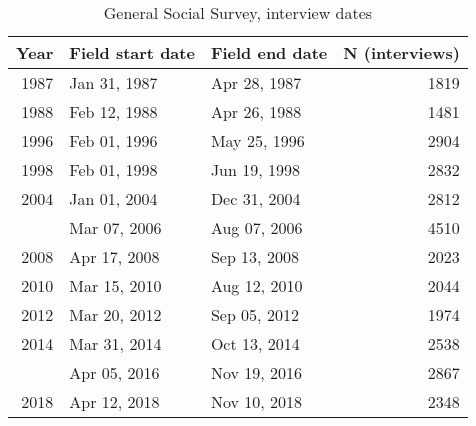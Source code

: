 \begin{table}[!h]

\caption{\label{tab:gss_date}General Social Survey, interview dates}
\centering
\begin{tabular}[t]{rllr}
\toprule
Year & Field start date & Field end date & N (interviews)\\
\midrule
1987 & Jan 31, 1987 & Apr 28, 1987 & 1819\\
1988 & Feb 12, 1988 & Apr 26, 1988 & 1481\\
1996 & Feb 01, 1996 & May 25, 1996 & 2904\\
1998 & Feb 01, 1998 & Jun 19, 1998 & 2832\\
2004 & Jan 01, 2004 & Dec 31, 2004 & 2812\\
\addlinespace
2006 & Mar 07, 2006 & Aug 07, 2006 & 4510\\
2008 & Apr 17, 2008 & Sep 13, 2008 & 2023\\
2010 & Mar 15, 2010 & Aug 12, 2010 & 2044\\
2012 & Mar 20, 2012 & Sep 05, 2012 & 1974\\
2014 & Mar 31, 2014 & Oct 13, 2014 & 2538\\
\addlinespace
2016 & Apr 05, 2016 & Nov 19, 2016 & 2867\\
2018 & Apr 12, 2018 & Nov 10, 2018 & 2348\\
\bottomrule
\end{tabular}
\end{table}